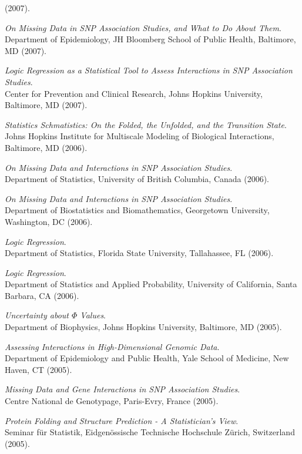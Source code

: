 \documentclass[10pt]{article}
\begin{document}
(2007).
\item
{\it On Missing Data in SNP Association Studies, and What to Do About Them}.\\
Department of Epidemiology, JH Bloomberg School of Public Health, Baltimore, MD
(2007).
\item
{\it Logic Regression as a Statistical Tool to Assess Interactions in SNP Association Studies}.\\
Center for Prevention and Clinical Research, Johns Hopkins University, Baltimore, MD
(2007).
\item
{\it Statistics Schmatistics: On the Folded, the Unfolded, and the Transition State}.\\
Johns Hopkins Institute for Multiscale Modeling of Biological Interactions, Baltimore, MD
(2006).  
\item
{\it On Missing Data and Interactions in SNP Association Studies}.\\
Department of Statistics, University of British Columbia, Canada
(2006).
\item
{\it On Missing Data and Interactions in SNP Association Studies}.\\
Department of Biostatistics and Biomathematics, Georgetown University, Washington, DC
(2006).
\item
{\it Logic Regression}.\\
Department of Statistics, Florida State University, Tallahassee, FL
(2006).
\item
{\it Logic Regression}.\\
Department of Statistics and Applied Probability, University of California, Santa Barbara, CA
(2006).  
\item
{\it Uncertainty about $\Phi$ Values}.\\
Department of Biophysics, Johns Hopkins University, Baltimore, MD
(2005).
\item
{\it Assessing Interactions in High-Dimensional Genomic Data}.\\
Department of Epidemiology and Public Health, Yale School of Medicine, New Haven, CT
(2005).
\item
{\it Missing Data and Gene Interactions in SNP Association Studies}.\\
Centre National de Genotypage, Paris-Evry, France
(2005).
\item
{\it Protein Folding and Structure Prediction - A Statistician's View}.\\
Seminar f\"ur Statistik, Eidgen\"ossische Technische Hochschule Z\"urich, Switzerland
(2005).
\end{document}
